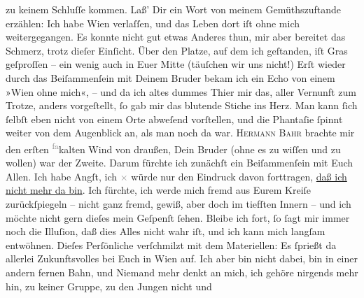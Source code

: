 \begin{ledgroupsized}[t]{13cm}
               zu keinem Schluſſe kommen. Laß’ Dir ein Wort von meinem Gemüthszuftande erzählen: Ich
               habe Wien verlaſſen, und das Leben dort iſt ohne
               mich weitergegangen. Es konnte nicht gut \strikeout{\textcolor{gray}{e}} etwas Anderes {\pb}thun, mir aber bereitet das
               Schmerz, trotz dieſer Einſicht. Über den Platze, auf dem ich geſtanden, iſt Gras
               geſproſſen – ein wenig auch in Euer Mitte (täuſchen wir uns nicht!) Erſt wieder durch
               das Beiſammenſein mit Deinem Bruder bekam ich ein Echo von einem »Wien
               ohne mich«, – und da ich altes dummes Thier mir das, aller Vernunft zum Trotze,
               anders vorgeſtellt, ſo  gab mir das blutende Stiche ins Herz. Man kann {\pb}ſich ſelbſt eben nicht von einem Orte abweſend
               vorſtellen, und die Phantaſie ſpinnt weiter von dem Augenblick an, als man noch da
               war. \textsc{Hermann Bahr} brachte mir den erſten \substVorne{}\textsuperscript{\textcolor{gray}{fa}}\substDazwischen{}ka\substHinten{}lten Wind von draußen, Dein Bruder (ohne es zu wiſſen und zu wollen) war der Zweite.
               Darum fürchte ich zunächſt ein Beiſammenſein mit Euch Allen. Ich habe Angſt, ich \textcolor{gray}{×} würde nur den Eindruck davon
               forttragen, \uline{daß ich nicht mehr da bin}. Ich fürchte,
               ich werde mich fremd aus Eurem Kreiſe zurückſpiegeln – nicht ganz fremd, gewiß, {\pb}aber doch im tiefſten Innern – und ich möchte nicht
               gern \introOben{}dieſes\introOben{} mein Geſpenſt ſehen. Bleibe ich fort, ſo ſagt
               mir immer noch die Illuſion, daß dies Alles nicht wahr iſt, und ich kann mich langſam
                   entwöhnen. Dieſes Perſönliche verſchmilzt mit dem Materiellen: Es ſprießt da
               allerlei Zukunftsvolles bei Euch in Wien auf. Ich
               aber bin nicht dabei, bin in einer andern fernen Bahn, und Niemand mehr denkt an mich,
                ich gehöre nirgends mehr hin, zu keiner Gruppe, zu den Jungen nicht und

\end{ledgroupsized}
